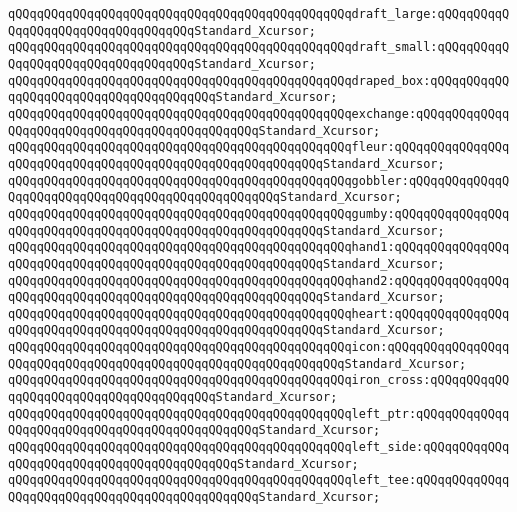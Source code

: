 \verb|qQQqqQQqqQQqqQQqqQQqqQQqqQQqqQQqqQQqqQQqqQQqqQQqdraft_large:qQQqqQQqqQQqqQQqqQQqqQQqqQQqqQQqqQQqStandard_Xcursor;|\newline
\verb|qQQqqQQqqQQqqQQqqQQqqQQqqQQqqQQqqQQqqQQqqQQqqQQqdraft_small:qQQqqQQqqQQqqQQqqQQqqQQqqQQqqQQqqQQqStandard_Xcursor;|\newline
\verb|qQQqqQQqqQQqqQQqqQQqqQQqqQQqqQQqqQQqqQQqqQQqqQQqdraped_box:qQQqqQQqqQQqqQQqqQQqqQQqqQQqqQQqqQQqqQQqStandard_Xcursor;|\newline
\verb|qQQqqQQqqQQqqQQqqQQqqQQqqQQqqQQqqQQqqQQqqQQqqQQqexchange:qQQqqQQqqQQqqQQqqQQqqQQqqQQqqQQqqQQqqQQqqQQqqQQqStandard_Xcursor;|\newline
\verb|qQQqqQQqqQQqqQQqqQQqqQQqqQQqqQQqqQQqqQQqqQQqqQQqfleur:qQQqqQQqqQQqqQQqqQQqqQQqqQQqqQQqqQQqqQQqqQQqqQQqqQQqqQQqqQQqStandard_Xcursor;|\newline
\verb|qQQqqQQqqQQqqQQqqQQqqQQqqQQqqQQqqQQqqQQqqQQqqQQqgobbler:qQQqqQQqqQQqqQQqqQQqqQQqqQQqqQQqqQQqqQQqqQQqqQQqqQQqStandard_Xcursor;|\newline
\verb|qQQqqQQqqQQqqQQqqQQqqQQqqQQqqQQqqQQqqQQqqQQqqQQqgumby:qQQqqQQqqQQqqQQqqQQqqQQqqQQqqQQqqQQqqQQqqQQqqQQqqQQqqQQqqQQqStandard_Xcursor;|\newline
\verb|qQQqqQQqqQQqqQQqqQQqqQQqqQQqqQQqqQQqqQQqqQQqqQQqhand1:qQQqqQQqqQQqqQQqqQQqqQQqqQQqqQQqqQQqqQQqqQQqqQQqqQQqqQQqqQQqStandard_Xcursor;|\newline
\verb|qQQqqQQqqQQqqQQqqQQqqQQqqQQqqQQqqQQqqQQqqQQqqQQqhand2:qQQqqQQqqQQqqQQqqQQqqQQqqQQqqQQqqQQqqQQqqQQqqQQqqQQqqQQqqQQqStandard_Xcursor;|\newline
\verb|qQQqqQQqqQQqqQQqqQQqqQQqqQQqqQQqqQQqqQQqqQQqqQQqheart:qQQqqQQqqQQqqQQqqQQqqQQqqQQqqQQqqQQqqQQqqQQqqQQqqQQqqQQqqQQqStandard_Xcursor;|\newline
\verb|qQQqqQQqqQQqqQQqqQQqqQQqqQQqqQQqqQQqqQQqqQQqqQQqicon:qQQqqQQqqQQqqQQqqQQqqQQqqQQqqQQqqQQqqQQqqQQqqQQqqQQqqQQqqQQqqQQqStandard_Xcursor;|\newline
\verb|qQQqqQQqqQQqqQQqqQQqqQQqqQQqqQQqqQQqqQQqqQQqqQQqiron_cross:qQQqqQQqqQQqqQQqqQQqqQQqqQQqqQQqqQQqqQQqStandard_Xcursor;|\newline
\verb|qQQqqQQqqQQqqQQqqQQqqQQqqQQqqQQqqQQqqQQqqQQqqQQqleft_ptr:qQQqqQQqqQQqqQQqqQQqqQQqqQQqqQQqqQQqqQQqqQQqqQQqStandard_Xcursor;|\newline
\verb|qQQqqQQqqQQqqQQqqQQqqQQqqQQqqQQqqQQqqQQqqQQqqQQqleft_side:qQQqqQQqqQQqqQQqqQQqqQQqqQQqqQQqqQQqqQQqqQQqStandard_Xcursor;|\newline
\verb|qQQqqQQqqQQqqQQqqQQqqQQqqQQqqQQqqQQqqQQqqQQqqQQqleft_tee:qQQqqQQqqQQqqQQqqQQqqQQqqQQqqQQqqQQqqQQqqQQqqQQqStandard_Xcursor;|\newline
